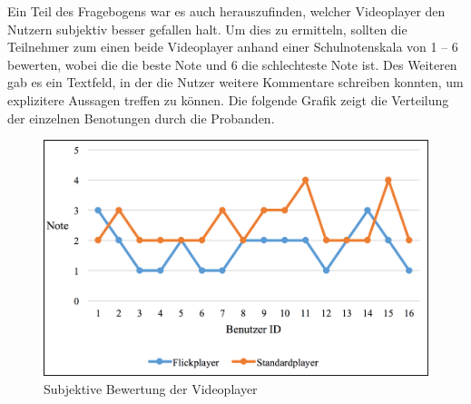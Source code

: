 \documentclass[11pt,a4paper]{report}
\begin{document}
Ein Teil des Fragebogens war es auch herauszufinden, welcher Videoplayer den Nutzern subjektiv besser gefallen halt. Um dies zu ermitteln, sollten die Teilnehmer zum einen beide Videoplayer anhand einer Schulnotenskala von 1 – 6 bewerten, wobei die die beste Note und 6 die schlechteste Note ist. Des Weiteren gab es ein Textfeld, in der die Nutzer weitere Kommentare schreiben konnten, um explizitere Aussagen treffen zu können. Die folgende Grafik zeigt die Verteilung der einzelnen Benotungen durch die Probanden.
\begin{figure}[h]
\begin{center}
\includegraphics[scale=0.9]{./images/38.png}
\caption{Subjektive Bewertung der Videoplayer}
\label{benotung}
\end{center}
\end{figure}
\end{document}
